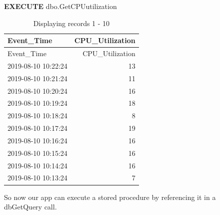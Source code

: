 \documentclass[]{article}
\newenvironment{Shaded}{\begin{snugshade}}{\end{snugshade}}
\newcommand{\CharTok}[1]{\textcolor[rgb]{0.31,0.60,0.02}{#1}}
\newcommand{\ControlFlowTok}[1]{\textcolor[rgb]{0.13,0.29,0.53}{\textbf{#1}}}
\newcommand{\DataTypeTok}[1]{\textcolor[rgb]{0.13,0.29,0.53}{#1}}
\newcommand{\DecValTok}[1]{\textcolor[rgb]{0.00,0.00,0.81}{#1}}
\newcommand{\KeywordTok}[1]{\textcolor[rgb]{0.13,0.29,0.53}{\textbf{#1}}}
\newcommand{\NormalTok}[1]{#1}
\newcommand{\OperatorTok}[1]{\textcolor[rgb]{0.81,0.36,0.00}{\textbf{#1}}}
\newcommand{\StringTok}[1]{\textcolor[rgb]{0.31,0.60,0.02}{#1}}
\begin{document}
\begin{Shaded}
\begin{Highlighting}[]
\KeywordTok{EXECUTE}\NormalTok{ dbo.GetCPUutilization}
\end{Highlighting}
\end{Shaded}

\begin{longtable}[]{@{}lr@{}}
\caption{Displaying records 1 - 10}\tabularnewline
\toprule
Event\_Time & CPU\_Utilization\tabularnewline
\midrule
\endfirsthead
\toprule
Event\_Time & CPU\_Utilization\tabularnewline
\midrule
\endhead
2019-08-10 10:22:24 & 13\tabularnewline
2019-08-10 10:21:24 & 11\tabularnewline
2019-08-10 10:20:24 & 16\tabularnewline
2019-08-10 10:19:24 & 18\tabularnewline
2019-08-10 10:18:24 & 8\tabularnewline
2019-08-10 10:17:24 & 19\tabularnewline
2019-08-10 10:16:24 & 16\tabularnewline
2019-08-10 10:15:24 & 16\tabularnewline
2019-08-10 10:14:24 & 16\tabularnewline
2019-08-10 10:13:24 & 7\tabularnewline
\bottomrule
\end{longtable}

So now our app can execute a stored procedure by referencing it in a
dbGetQuery call.

\begin{Shaded}
\end{Shaded}
\end{document}
